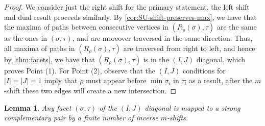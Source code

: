 \documentclass{amsart}
\newtheorem{lemma}[theorem]{Lemma}
\theoremstyle{definition}
\begin{document}
\begin{proof}
    We consider just the right shift for the primary statement, the left shift and dual result proceeds similarly. 
    By \cref{cor:SU-shift-preserves-max}, we have that the maxima of paths between consecutive vertices in $(R_{\rho}(\sigma),\tau)$ are the same as the ones in $(\sigma,\tau)$, and are moreover traversed in the same direction.
    Thus, all maxima of paths in $(R_{\rho}(\sigma),\tau)$ are traversed from right to left, and hence by \cref{thm:facets}, we have that $(R_{\rho}(\sigma),\tau)$ is in the $(I,J)$ diagonal, which proves Point (1).
    For Point (2), observe that the $(I,J)$ conditions for $|I|=|J|=1$ imply that $\rho$ must appear before $\min \sigma_i$ in $\tau$; as a result, after the $m$-shift these two edges will create a new intersection.
\end{proof}

\begin{lemma}
\label{lem:inverse-to-SCP}
Any facet $(\sigma,\tau)$ of the $(I,J)$ diagonal is mapped to a strong complementary pair by a finite number of inverse $m$-shifts.
\end{lemma}
\end{document}
